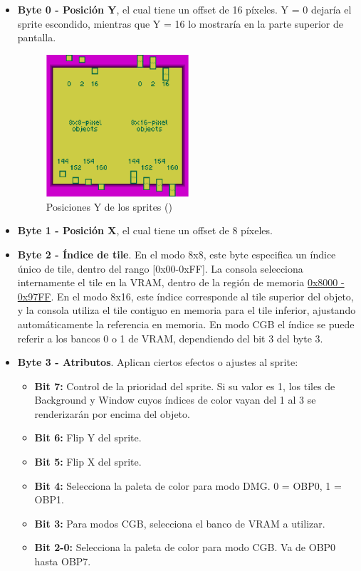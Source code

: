 \begin{itemize}
    \item \textbf{Byte 0 - Posición Y}, el cual tiene un offset de 16 píxeles. Y = 0 dejaría el sprite escondido, mientras que Y = 16 lo mostraría en la parte superior de pantalla.
    
    \begin{figure}[H]
        \centering
        \includegraphics[width=0.5\textwidth]{include/images/y_position.png}
        \caption{Posiciones Y de los sprites (\cite{newpandocs})}
        \label{figure:y_positions}
    \end{figure}

    \item \textbf{Byte 1 - Posición X}, el cual tiene un offset de 8 píxeles.
    \item \textbf{Byte 2 - Índice de tile}. En el modo 8x8, este byte especifica un índice único de tile, dentro del rango [0x00-0xFF]. La consola selecciona internamente el tile en la VRAM, dentro de la región de memoria \hyperref[mem:vram_1]{0x8000 - 0x97FF}. En el modo 8x16, este índice corresponde al tile superior del objeto, y la consola utiliza el tile contiguo en memoria para el tile inferior, ajustando automáticamente la referencia en memoria. En modo CGB el índice se puede referir a los bancos 0 o 1 de VRAM, dependiendo del bit 3 del byte 3.
    \item \textbf{Byte 3 - Atributos}. Aplican ciertos efectos o ajustes al sprite:
        \begin{itemize}
            \item \textbf{Bit 7:} Control de la prioridad del sprite. Si su valor es 1, los tiles de Background y Window cuyos índices de color vayan del 1 al 3 se renderizarán por encima del objeto.
            \item \textbf{Bit 6:} Flip Y del sprite.
            \item \textbf{Bit 5:} Flip X del sprite.
            \item \textbf{Bit 4:} Selecciona la paleta de color para modo DMG. 0 = OBP0, 1 = OBP1.
            \item \textbf{Bit 3:} Para modos CGB, selecciona el banco de VRAM a utilizar.
            \item \textbf{Bit 2-0:} Selecciona la paleta de color para modo CGB. Va de OBP0 hasta OBP7.
        \end{itemize}

\end{itemize}

